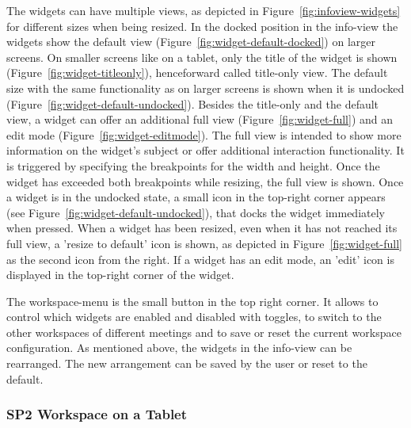 \documentclass{sigchi}
\begin{document}
The widgets can have multiple views, as depicted in Figure~\ref{fig:infoview-widgets} for different sizes when being resized.
In the docked position in the info-view the widgets show the default view (Figure~\ref{fig:widget-default-docked}) on larger screens. 
On smaller screens like on a tablet, only the title of the widget is shown (Figure~\ref{fig:widget-titleonly}), henceforward called title-only view.
The default size with the same functionality as on larger screens is shown when it is undocked (Figure~\ref{fig:widget-default-undocked}).
Besides the title-only and the default view, a widget can offer an additional full view (Figure~\ref{fig:widget-full}) and an edit mode (Figure~\ref{fig:widget-editmode}).
The full view is intended to show more information on the widget's subject or offer additional interaction functionality.
It is triggered by specifying the breakpoints for the width and height.
Once the widget has exceeded both breakpoints while resizing, the full view is shown.
Once a widget is in the undocked state, a small icon in the top-right corner appears (see Figure~\ref{fig:widget-default-undocked}), that docks the widget immediately when pressed.
When a widget has been resized, even when it has not reached its full view, a 'resize to default' icon is shown, as depicted in Figure~\ref{fig:widget-full} as the second icon from the right.
If a widget has an edit mode, an 'edit' icon is displayed in the top-right corner of the widget.

The workspace-menu is the small button in the top right corner.
It allows to control which widgets are enabled and disabled with toggles, to switch to the other workspaces of different meetings and to save or reset the current workspace configuration.
As mentioned above, the widgets in the info-view can be rearranged.
The new arrangement can be saved by the user or reset to the default.


\subsubsection{SP2 Workspace on a Tablet}
\end{document}

